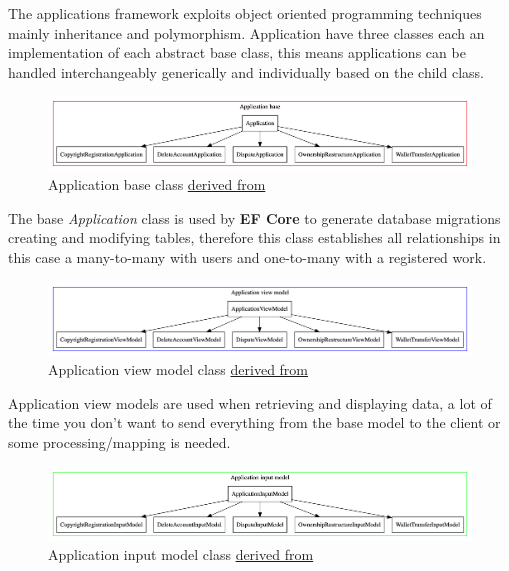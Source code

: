 The applications framework exploits object oriented programming techniques mainly inheritance and polymorphism. Application have three classes each an implementation of each abstract base class, this means applications can be handled interchangeably generically and individually based on the child class.

\begin{figure}[H]
\caption{Application base class \href{https://github.com/MrHarrisonBarker/CRPL/blob/main/CRPL.Data/Applications/DataModels/Application.cs}{derived from}}
\centering
\includegraphics[width=\textwidth,height=0.5\textheight,keepaspectratio]{images/operational/application-base}
\end{figure}

The base \textit{Application} class is used by \textbf{EF Core} to generate database migrations creating and modifying tables, therefore this class establishes all relationships in this case a many-to-many with users and one-to-many with a registered work.

\begin{figure}[H]
\caption{Application view model class \href{https://github.com/MrHarrisonBarker/CRPL/blob/main/CRPL.Data/Applications/ViewModels/ApplicationViewModel.cs}{derived from}}
\centering
\includegraphics[width=\textwidth,height=0.5\textheight,keepaspectratio]{images/operational/application-view}
\end{figure}

Application view models are used when retrieving and displaying data, a lot of the time you don't want to send everything from the base model to the client or some processing/mapping is needed.
 
\begin{figure}[H]
\caption{Application input model class \href{https://github.com/MrHarrisonBarker/CRPL/blob/main/CRPL.Data/Applications/InputModels/ApplicationInputModel.cs}{derived from}}
\centering
\includegraphics[width=\textwidth,height=0.5\textheight,keepaspectratio]{images/operational/application-input}
\end{figure}

